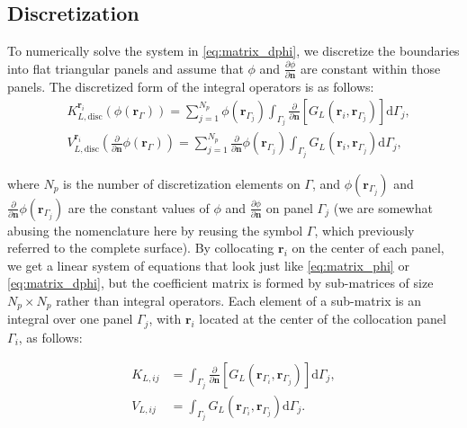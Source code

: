 

\subsection{Discretization}

To numerically solve the system in \eqref{eq:matrix_dphi}, we discretize the boundaries into flat triangular panels and assume that $\phi$ and $\frac{\partial \phi}{\partial \mathbf{n}}$ are constant within those panels. The discretized form of the integral operators is as follows:
%
\begin{align} \label{eq:layers_disc}
&K_{L,\text{disc}}^{\mathbf{r}_i}\left(\phi(\mathbf{r}_{\Gamma})\right) =  \sum_{j=1}^{N_p}\phi(\mathbf{r}_{\Gamma_j})\int_{\Gamma_j} \frac{\partial}{\partial \mathbf{n}} \left[ G_L(\mathbf{r}_{i},\mathbf{r}_{\Gamma_j}) \right]\mathrm{d} \Gamma_j,  \nonumber \\
&V_{L,\text{disc}}^{\mathbf{r}_i} \left( \frac{\partial}{\partial \mathbf{n}} \phi(\mathbf{r}_{\Gamma}) \right) = \sum_{j=1}^{N_p} \frac{\partial}{\partial \mathbf{n}} \phi(\mathbf{r}_{\Gamma_j}) \int_{\Gamma_j} G_L(\mathbf{r}_{i},\mathbf{r}_{\Gamma_j})  \mathrm{d} \Gamma_j,
\end{align}

\noindent where $N_p$ is the number of discretization elements on $\Gamma$, and $\phi(\mathbf{r}_{\Gamma_j})$ and $\frac{\partial}{\partial \mathbf{n}} \phi(\mathbf{r}_{\Gamma_j})$ are the constant values of $\phi$ and $\frac{\partial \phi}{\partial \mathbf{n}}$ on panel $\Gamma_j$ (we are somewhat abusing the nomenclature here by reusing the symbol $\Gamma$, which previously referred to the complete surface). By collocating $\mathbf{r}_i$ on the center of each panel, we get a linear system of equations that look just like \eqref{eq:matrix_phi} or \eqref{eq:matrix_dphi}, but the coefficient matrix is formed by sub-matrices of size $N_p \times N_p$ rather than integral operators. Each element of a sub-matrix is an integral over one panel $\Gamma_j$, with $\mathbf{r}_i$ located at the center of the collocation panel $\Gamma_i$, as follows:

\begin{align} \label{eq:layers_element}
K_{L,ij} &= \int_{\Gamma_j} \frac{\partial}{\partial \mathbf{n}} \left[ G_L(\mathbf{r}_{\Gamma_i},\mathbf{r}_{\Gamma_j}) \right]\mathrm{d} \Gamma_j, \nonumber \\
V_{L,ij} &= \int_{\Gamma_j} G_L(\mathbf{r}_{\Gamma_i},\mathbf{r}_{\Gamma_j})  \mathrm{d} \Gamma_j.
\end{align}

